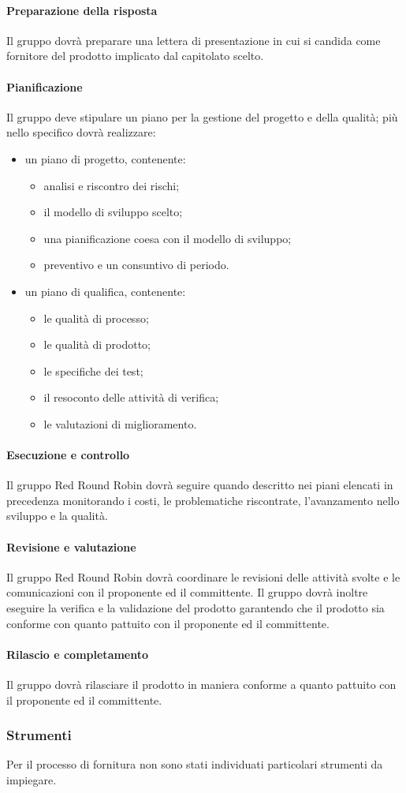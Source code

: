 		\paragraph{Preparazione della risposta}
			Il gruppo dovrà preparare una lettera di presentazione in cui si candida come fornitore del prodotto implicato dal capitolato scelto.
		\paragraph{Pianificazione}
			Il gruppo deve stipulare un piano per la gestione del progetto e della qualità; più nello specifico dovrà realizzare:
			\begin{itemize}
				\item un piano di progetto, contenente:
				\begin{itemize}
				 	\item analisi e riscontro dei rischi;
				 	\item il modello di sviluppo scelto;
				 	\item una pianificazione coesa con il modello di sviluppo;
				 	\item preventivo e un consuntivo di periodo.
				 \end{itemize} 
				\item un piano di qualifica, contenente: 
				\begin{itemize}
					\item le qualità di processo;
					\item le qualità di prodotto;
					\item le specifiche dei test;
					\item il resoconto delle attività di verifica;
					\item le valutazioni di miglioramento.
				\end{itemize}
			\end{itemize}
			
		\paragraph{Esecuzione e controllo}
			Il gruppo Red Round Robin dovrà seguire quando descritto nei piani elencati in precedenza monitorando i costi, le problematiche riscontrate, l'avanzamento nello sviluppo e la qualità.
		\paragraph{Revisione e valutazione}
			Il gruppo Red Round Robin dovrà coordinare le revisioni delle attività svolte e le comunicazioni con il proponente ed il committente. Il gruppo dovrà inoltre eseguire la verifica e la validazione del prodotto garantendo che il prodotto sia conforme con quanto pattuito con il proponente ed il committente.
		\paragraph{Rilascio e completamento}
			Il gruppo dovrà rilasciare il prodotto in maniera conforme a quanto pattuito con il proponente ed il committente.
	\subsubsection{Strumenti}
		Per il processo di fornitura non sono stati individuati particolari strumenti da impiegare.
